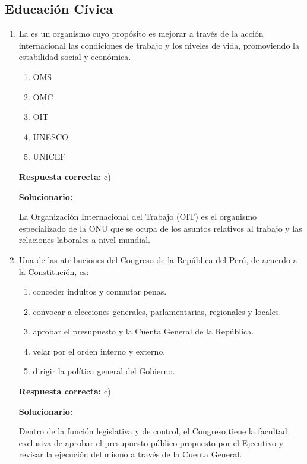 \subsection*{Educación Cívica}

\begin{enumerate}[resume]

	\item La \underline{\hspace{3cm}} es un organismo cuyo propósito es mejorar a través de la acción internacional las condiciones de trabajo y los niveles de vida, promoviendo la estabilidad social y económica.
	\begin{enumerate}[label=\alph*)]
		\item OMS
		\item OMC
		\item OIT
		\item UNESCO
		\item UNICEF
	\end{enumerate}
	\textbf{Respuesta correcta:} c)

	\vspace{2mm}
	\textbf{Solucionario:}

	La Organización Internacional del Trabajo (OIT) es el organismo especializado de la ONU que se ocupa de los asuntos relativos al trabajo y las relaciones laborales a nivel mundial.

	\vspace{6mm}

	\item Una de las atribuciones del Congreso de la República del Perú, de acuerdo a la Constitución, es:
	\begin{enumerate}[label=\alph*)]
		\item conceder indultos y conmutar penas.
		\item convocar a elecciones generales, parlamentarias, regionales y locales.
		\item aprobar el presupuesto y la Cuenta General de la República.
		\item velar por el orden interno y externo.
		\item dirigir la política general del Gobierno.
	\end{enumerate}
	\textbf{Respuesta correcta:} c)

	\vspace{2mm}
	\textbf{Solucionario:}

	Dentro de la función legislativa y de control, el Congreso tiene la facultad exclusiva de aprobar el presupuesto público propuesto por el Ejecutivo y revisar la ejecución del mismo a través de la Cuenta General.

	\vspace{6mm}

\end{enumerate}


